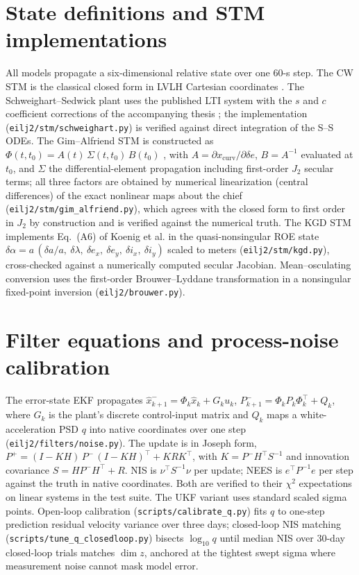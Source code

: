 \section{State definitions and STM implementations}\label{app:stm}

All models propagate a six-dimensional relative state over one 60-s step.
The CW STM is the classical closed form in LVLH Cartesian coordinates
\cite{clohessy1960terminal}. The Schweighart--Sedwick plant uses the
published LTI system \cite{schweighart2002highfidelity} with the
$s$ and $c$ coefficient corrections of the accompanying thesis
\cite{schweighart2001thesis}; the implementation
(\texttt{eilj2/stm/schweighart.py}) is verified against direct integration
of the S--S ODEs. The Gim--Alfriend STM is constructed as
$\Phi(t,t_0) = A(t)\,\Sigma(t,t_0)\,B(t_0)$ \cite{gim2003state}, with
$A = \partial x_{\mathrm{curv}} / \partial \delta e$,
$B = A^{-1}$ evaluated at $t_0$, and $\Sigma$ the differential-element
propagation including first-order $J_2$ secular terms; all three factors
are obtained by numerical linearization (central differences) of the exact
nonlinear maps about the chief (\texttt{eilj2/stm/gim\_alfriend.py}),
which agrees with the closed form to first order in $J_2$ by construction
and is verified against the numerical truth. The KGD STM implements
Eq.~(A6) of Koenig et al. \cite{koenig2017stm} in the quasi-nonsingular
ROE state
$\delta\alpha = a\,(\delta a/a,\ \delta\lambda,\ \delta e_x,\ \delta e_y,
\ \delta i_x,\ \delta i_y)$
scaled to meters (\texttt{eilj2/stm/kgd.py}), cross-checked against a
numerically computed secular Jacobian. Mean--osculating conversion uses the
first-order Brouwer--Lyddane transformation in a nonsingular fixed-point
inversion (\texttt{eilj2/brouwer.py}).

\section{Filter equations and process-noise calibration}\label{app:filters}

The error-state EKF propagates
$\hat{x}_{k+1}^- = \Phi_k \hat{x}_k + G_k u_k$,
$P_{k+1}^- = \Phi_k P_k \Phi_k^\top + Q_k$, where $G_k$ is the plant's
discrete control-input matrix and $Q_k$ maps a white-acceleration PSD $q$
into native coordinates over one step
(\texttt{eilj2/filters/noise.py}). The update is in Joseph form,
$P^+ = (I - KH)\,P^-\,(I - KH)^\top + K R K^\top$, with
$K = P^- H^\top S^{-1}$ and innovation covariance
$S = H P^- H^\top + R$. NIS is $\nu^\top S^{-1} \nu$ per update; NEES is
$e^\top P^{-1} e$ per step against the truth in native coordinates. Both
are verified to their $\chi^2$ expectations on linear systems in the test
suite. The UKF variant uses standard scaled sigma points. Open-loop
calibration (\texttt{scripts/calibrate\_q.py}) fits $q$ to one-step
prediction residual velocity variance over three days; closed-loop
NIS matching (\texttt{scripts/tune\_q\_closedloop.py}) bisects
$\log_{10} q$ until median NIS over 30-day closed-loop trials matches
$\dim z$, anchored at the tightest swept sigma where measurement noise
cannot mask model error.

